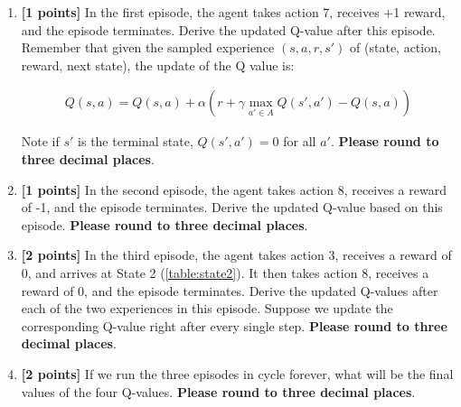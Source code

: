 \begin{enumerate}
\item \textbf{[1 points]} In the first episode, the agent takes action 7, receives +1 reward, and the episode terminates. Derive the updated Q-value after this episode. Remember that given the sampled experience $(s, a, r, s')$ of (state, action, reward, next state), the update of the Q value is:

\begin{align}
Q(s, a) = Q(s, a) + \alpha \left(r + \gamma \max_{a' \in A}Q(s', a') - Q(s,a) \right)
\end{align}

Note if $s'$ is the terminal state, $Q(s', a') = 0$ for all $a'$.  \textbf{Please round to three decimal places}.

\begin{tcolorbox}[fit,height=1cm, width=\linewidth, blank, borderline={1pt}{-2pt},nobeforeafter]
\end{tcolorbox}


\item \textbf{[1 points]} In the second episode, the agent takes action 8, receives a reward of -1, and the episode terminates. Derive the updated Q-value based on this episode.  \textbf{Please round to three decimal places}.

\begin{tcolorbox}[fit,height=1cm, width=\linewidth, blank, borderline={1pt}{-2pt},nobeforeafter]
\end{tcolorbox}


\item \textbf{[2 points]} In the third episode, the agent takes action 3, receives a reward of 0, and arrives at State 2 (\ref{table:state2}). It then takes action 8, receives a reward of 0, and the episode terminates. Derive the updated Q-values after each of the two experiences in this episode. Suppose we update the corresponding Q-value right after every single step.
 \textbf{Please round to three decimal places}.

\begin{tcolorbox}[fit,height=3cm, width=\linewidth, blank, borderline={1pt}{-2pt},nobeforeafter]
\end{tcolorbox}


\item \textbf{[2 points]} If we run the three episodes in cycle forever, what will be the final values of the four Q-values.  \textbf{Please round to three decimal places}.


\end{enumerate}
